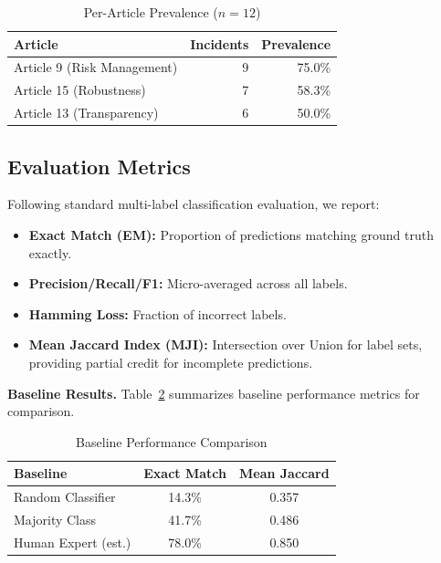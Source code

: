 \documentclass[10pt,conference]{IEEEtran}
\begin{document}
\begin{table}[htbp]
\caption{Per-Article Prevalence ($n=12$)}
\label{tab:article-prevalence}
\centering
\begin{tabular}{lrr}
\toprule
\textbf{Article} & \textbf{Incidents} & \textbf{Prevalence} \\
\midrule
Article 9 (Risk Management) & 9 & 75.0\% \\
Article 15 (Robustness) & 7 & 58.3\% \\
Article 13 (Transparency) & 6 & 50.0\% \\
\bottomrule
\end{tabular}
\end{table}

\subsection{Evaluation Metrics}

Following standard multi-label classification evaluation, we report:

\begin{itemize}
    \item \textbf{Exact Match (EM):} Proportion of predictions matching ground truth exactly.
    \item \textbf{Precision/Recall/F1:} Micro-averaged across all labels.
    \item \textbf{Hamming Loss:} Fraction of incorrect labels.
    \item \textbf{Mean Jaccard Index (MJI):} Intersection over Union for label sets, providing partial credit for incomplete predictions.
\end{itemize}

\textbf{Baseline Results.} Table~\ref{tab:baselines} summarizes baseline performance metrics for comparison.

\begin{table}[htbp]
\caption{Baseline Performance Comparison}
\label{tab:baselines}
\centering
\small
\begin{tabular}{lcc}
\toprule
\textbf{Baseline} & \textbf{Exact Match} & \textbf{Mean Jaccard} \\
\midrule
Random Classifier & 14.3\% & 0.357 \\
Majority Class & 41.7\% & 0.486 \\
Human Expert (est.) & 78.0\% & 0.850 \\
\bottomrule
\end{tabular}
\end{table}
\end{document}

